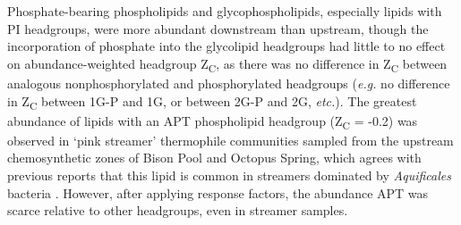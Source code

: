 Phosphate-bearing phospholipids and glycophospholipids, especially lipids with PI headgroups, were more abundant downstream than upstream, though the incorporation of phosphate into the glycolipid headgroups had little to no effect on abundance-weighted headgroup Z\textsubscript{C}, as there was no difference in Z\textsubscript{C} between analogous nonphosphorylated and phosphorylated headgroups (\textit{e.g.} no difference in Z\textsubscript{C} between 1G-P and 1G, or between 2G-P and 2G, \textit{etc.}). The greatest abundance of lipids with an APT phospholipid headgroup (Z\textsubscript{C} = -0.2) was observed in `pink streamer' thermophile communities sampled from the upstream chemosynthetic zones of Bison Pool and Octopus Spring, which agrees with previous reports that this lipid is common in streamers dominated by \textit{Aquificales} bacteria \citep{Sturt_Intact_2004, schubotz2013spatial}. However, after applying response factors, the abundance APT was scarce relative to other headgroups, even in streamer samples.



